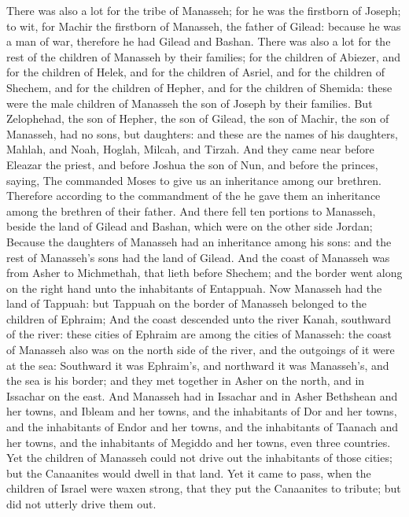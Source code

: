 \begin{biblechapter} %
\verse There was also a lot for the tribe of Manasseh; for he was the firstborn of Joseph; to wit, for Machir the firstborn of Manasseh, the father of Gilead: because he was a man of war, therefore he had Gilead and Bashan.
\verse There was also a lot for the rest of the children of Manasseh by their families; for the children of Abiezer, and for the children of Helek, and for the children of Asriel, and for the children of Shechem, and for the children of Hepher, and for the children of Shemida: these were the male children of Manasseh the son of Joseph by their families.
\verse But Zelophehad, the son of Hepher, the son of Gilead, the son of Machir, the son of Manasseh, had no sons, but daughters: and these are the names of his daughters, Mahlah, and Noah, Hoglah, Milcah, and Tirzah.
\verse And they came near before Eleazar the priest, and before Joshua the son of Nun, and before the princes, saying, The \LORD commanded Moses to give us an inheritance among our brethren. Therefore according to the commandment of the \LORD he gave them an inheritance among the brethren of their father.
\verse And there fell ten portions to Manasseh, beside the land of Gilead and Bashan, which were on the other side Jordan;
\verse Because the daughters of Manasseh had an inheritance among his sons: and the rest of Manasseh's sons had the land of Gilead.
\verse And the coast of Manasseh was from Asher to Michmethah, that lieth before Shechem; and the border went along on the right hand unto the inhabitants of Entappuah.
\verse Now Manasseh had the land of Tappuah: but Tappuah on the border of Manasseh belonged to the children of Ephraim;
\verse And the coast descended unto the river Kanah, southward of the river: these cities of Ephraim are among the cities of Manasseh: the coast of Manasseh also was on the north side of the river, and the outgoings of it were at the sea:
\verse Southward it was Ephraim's, and northward it was Manasseh's, and the sea is his border; and they met together in Asher on the north, and in Issachar on the east.
\verse And Manasseh had in Issachar and in Asher Bethshean and her towns, and Ibleam and her towns, and the inhabitants of Dor and her towns, and the inhabitants of Endor and her towns, and the inhabitants of Taanach and her towns, and the inhabitants of Megiddo and her towns, even three countries.
\verse Yet the children of Manasseh could not drive out the inhabitants of those cities; but the Canaanites would dwell in that land.
\verse Yet it came to pass, when the children of Israel were waxen strong, that they put the Canaanites to tribute; but did not utterly drive them out.

\end{biblechapter}
